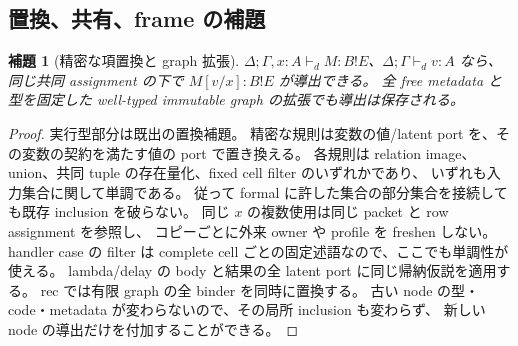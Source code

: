 \documentclass[11pt,a4paper]{article}
\newtheorem{lemma}[definition]{補題}
\begin{document}
\subsection{置換、共有、frame の補題}

\begin{lemma}[精密な項置換と graph 拡張]
\(\Delta;\Gamma,x:A\vdash_d M:B!E\)、\(\Delta;\Gamma\vdash_d v:A\) なら、
同じ共同 assignment の下で \(M[v/x]:B!E\) が導出できる。
全 free metadata と型を固定した well-typed immutable graph の拡張でも導出は保存される。
\end{lemma}
\begin{proof}
実行型部分は既出の置換補題。
精密な規則は変数の値/latent port を、その変数の契約を満たす値の port で置き換える。
各規則は relation image、union、共同 tuple の存在量化、fixed cell filter のいずれかであり、
いずれも入力集合に関して単調である。
従って formal に許した集合の部分集合を接続しても既存 inclusion を破らない。
同じ \(x\) の複数使用は同じ packet と row assignment を参照し、
コピーごとに外来 owner や profile を freshen しない。
handler case の filter は complete cell ごとの固定述語なので、ここでも単調性が使える。
lambda/delay の body と結果の全 latent port に同じ帰納仮説を適用する。
rec では有限 graph の全 binder を同時に置換する。
古い node の型・code・metadata が変わらないので、その局所 inclusion も変わらず、
新しい node の導出だけを付加することができる。
\end{proof}
\end{document}
